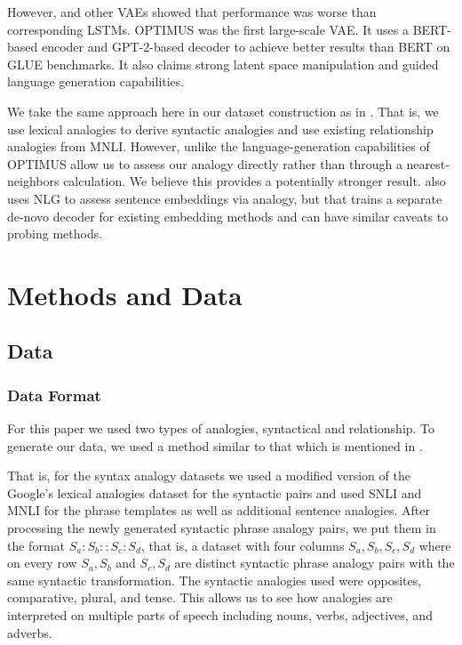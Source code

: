 \documentclass[11pt]{article}
\begin{document}
However, \citet{bowman-etal-2016-generating} and other VAEs showed that performance was worse than corresponding LSTMs. OPTIMUS \cite{li2020_Optimus} was the first large-scale VAE. It uses a BERT-based encoder and GPT-2-based decoder to achieve better results than BERT on GLUE benchmarks. It also claims strong latent space manipulation and guided language generation capabilities. 

We take the same approach here in our dataset construction as in \cite{zhu-de-melo-2020-sentence}. That is, we use lexical analogies to derive syntactic analogies and use existing relationship analogies from MNLI. However, unlike \cite{zhu-de-melo-2020-sentence} the language-generation capabilities of OPTIMUS allow us to assess our analogy directly rather than through a nearest-neighbors calculation. We believe this provides a potentially stronger result. \citet{kerscher2020vec2sent}  also uses NLG to assess sentence embeddings via analogy, but that trains a separate de-novo decoder for existing embedding methods and can have similar caveats to probing methods.

\section{Methods and Data}

\subsection{Data}

\subsubsection{Data Format}

For this paper we used two types of analogies, syntactical and relationship. To generate our data, we used a method similar to that which is mentioned in \cite{zhu-de-melo-2020-sentence}. 

That is, for the syntax analogy datasets we used a modified version of the Google's lexical analogies dataset \cite{vec2sent} for the syntactic pairs and used SNLI \cite{snli:emnlp2015} and MNLI \cite{N18-1101} for the phrase templates as well as additional sentence analogies.  After processing the newly generated syntactic phrase analogy pairs, we put them in the format $S_a:S_b::S_c:S_d$, that is, a dataset with four columns $S_a,S_b,S_c,S_d$ where on every row $S_a, S_b$ and $S_c,S_d$ are distinct syntactic phrase analogy pairs with the same syntactic transformation. The syntactic analogies used were opposites, comparative, plural, and tense. This allows us to see how analogies are interpreted on multiple parts of speech including nouns, verbs, adjectives, and adverbs. 
\end{document}
